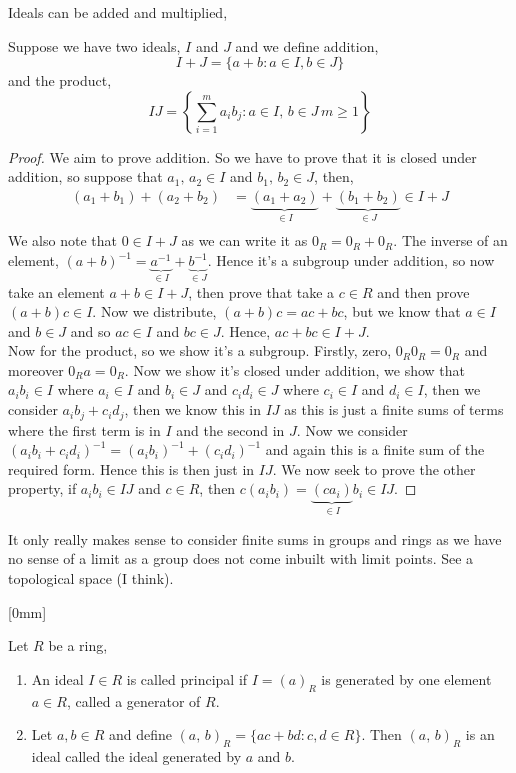 Ideals can be added and multiplied,
\begin{ndefi}
  Suppose we have two ideals, $I$ and $J$ and we define addition,
  $$ I + J = \{ a + b : a \in I, b \in J\} $$
  and the product,
  $$ IJ = \left\{\sum_{i=1}^m a_ib_j : a \in I,\,b\in J\, m \ge 1 \right\} $$
\end{ndefi}
\begin{proof}
  We aim to prove addition. So we have to prove that it is closed under addition, so suppose that $a_1,\,a_2 \in I$ and $b_1,\,b_2 \in J$, then,
  \begin{align*}
    (a_1 + b_1) + (a_2 + b_2) &= \underbrace{(a_1 + a_2)}_{\in I} + \underbrace{(b_1 + b_2)}_{\in J} \in I + J\\
  \end{align*}
  We also note that $0 \in I + J$ as we can write it as $0_R = 0_R + 0_R$. The inverse of an element, $(a + b)^{-1} = \underbrace{a^{-1}}_{\in I} + \underbrace{b^{-1}}_{\in J}$. Hence it's a subgroup under addition, so now take an element $a+b \in I + J$, then prove that take a $c \in R$ and then prove $(a + b)c \in I$. Now we distribute, $(a + b)c = ac + bc$, but we know that $a \in I$ and $b \in J$ and so $ac \in I$ and $bc \in J$. Hence, $ac + bc \in I + J$.\\

  \noindent
  Now for the product, so we show it's a subgroup. Firstly, zero, $0_R 0_R = 0_R$ and moreover $0_Ra = 0_R$. Now we show it's closed under addition, we show that $a_ib_i \in I$ where $a_i \in I$ and $b_i \in J$ and $c_id_i \in J$ where $c_i \in I$ and $d_i \in I$, then we consider $a_ib_j + c_id_j$, then we know this in $IJ$ as this is just a finite sums of terms where the first term is in $I$ and the second in $J$. Now we consider $(a_ib_i + c_id_i)^{-1} = (a_ib_i)^{-1} + (c_id_i)^{-1}$ and again this is a finite sum of the required form. Hence this is then just in $IJ$. We now seek to prove the other property, if $a_ib_i \in IJ$ and $c \in R$, then $c (a_ib_i) = \underbrace{(ca_i)}_{\in I}b_i \in IJ$.
\end{proof}

\begin{remark}
   It only really makes sense to consider finite sums in groups and rings as we have no sense of a limit as a group does not come inbuilt with limit points. See a topological space (I think).
\end{remark}
[0mm]
\begin{ndefi}
  Let $R$ be a ring,
  \begin{enumerate}
    \item An ideal $I \in R$ is called principal if $I = (a)_R$ is generated by one element $a \in R$, called a generator of $R$.
    \item Let $a, b \in R$ and define $(a,\,b)_R = \{ac + bd : c, d \in R\}$. Then $(a,\,b)_R$ is an ideal called the ideal generated by $a$ and $b$.
  \end{enumerate}
\end{ndefi}

